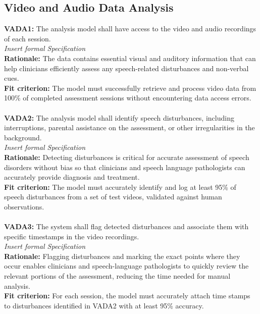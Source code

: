 \documentclass[12pt]{article}
\begin{document}
\subsection{Video and Audio Data Analysis}
\textbf{VADA1: }The analysis model shall have access to the video and audio recordings of each session.\\
\textit{Insert formal Specification}\\
\textbf{Rationale: }The data contains essential visual and auditory information that can help clinicians 
efficiently assess any speech-related disturbances and non-verbal cues.\\
\textbf{Fit criterion: }The model must successfully retrieve and process video data from 100\% of 
completed assessment sessions without encountering data access errors.\\\\
\textbf{VADA2: }The analysis model shall identify speech disturbances, including interruptions, parental 
assistance on the assessment, or other irregularities in the background.\\
\textit{Insert formal Specification}\\
\textbf{Rationale: }Detecting disturbances is critical for accurate assessment of speech disorders without 
bias so that clinicians and speech language pathologists can accurately provide diagnosis and treatment.\\
\textbf{Fit criterion: }The model must accurately identify and log at least 95\% of speech disturbances 
from a set of test videos, validated against human observations.\\\\
\textbf{VADA3: }The system shall flag detected disturbances and associate them with specific timestamps in the 
video recordings.\\
\textit{Insert formal Specification}\\
\textbf{Rationale: }Flagging disturbances and marking the exact points where they occur enables clinicians and 
speech-language pathologists to quickly review the relevant portions of the assessment, reducing the time needed 
for manual analysis.\\
\textbf{Fit criterion: }For each session, the model must accurately attach time stamps to disturbances
identified in VADA2 with at least 95\% accuracy.\\\\
\end{document}
